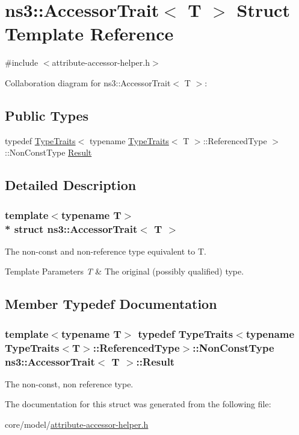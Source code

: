 \hypertarget{structns3_1_1AccessorTrait}{}\section{ns3\+:\+:Accessor\+Trait$<$ T $>$ Struct Template Reference}
\label{structns3_1_1AccessorTrait}


{\ttfamily \#include $<$attribute-\/accessor-\/helper.\+h$>$}



Collaboration diagram for ns3\+:\+:Accessor\+Trait$<$ T $>$\+:
\subsection*{Public Types}
\begin{DoxyCompactItemize}
\item 
typedef \hyperlink{structTypeTraits}{Type\+Traits}$<$ typename \hyperlink{structTypeTraits}{Type\+Traits}$<$ T $>$\+::Referenced\+Type $>$\+::Non\+Const\+Type \hyperlink{structns3_1_1AccessorTrait_acd9bce3955a29ceceb6e8c0af6566a00}{Result}
\end{DoxyCompactItemize}


\subsection{Detailed Description}
\subsubsection*{template$<$typename T$>$\\*
struct ns3\+::\+Accessor\+Trait$<$ T $>$}

The non-\/const and non-\/reference type equivalent to {\ttfamily T}.


\begin{DoxyTemplParams}{Template Parameters}
{\em T} & The original (possibly qualified) type. \\
\hline
\end{DoxyTemplParams}


\subsection{Member Typedef Documentation}
\subsubsection[{\texorpdfstring{Result}{Result}}]{\setlength{\rightskip}{0pt plus 5cm}template$<$typename T$>$ typedef {\bf Type\+Traits}$<$typename {\bf Type\+Traits}$<$T$>$\+::Referenced\+Type$>$\+::Non\+Const\+Type {\bf ns3\+::\+Accessor\+Trait}$<$ T $>$\+::{\bf Result}}\hypertarget{structns3_1_1AccessorTrait_acd9bce3955a29ceceb6e8c0af6566a00}{}\label{structns3_1_1AccessorTrait_acd9bce3955a29ceceb6e8c0af6566a00}
The non-\/const, non reference type. 

The documentation for this struct was generated from the following file\+:\begin{DoxyCompactItemize}
\item 
core/model/\hyperlink{attribute-accessor-helper_8h}{attribute-\/accessor-\/helper.\+h}\end{DoxyCompactItemize}
